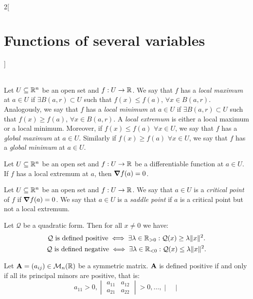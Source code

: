 \documentclass[../../../main_math.tex]{subfiles}
\begin{document}
\begin{multicols}{2}[\section{Functions of several variables}]
\begin{remark}
\begin{align*}
    \end{align*}
  \end{remark}
  \begin{definition}
    Let $U\subseteq\RR^n$ be an open set and $f:U\rightarrow\RR $. We say that $f$ has a \emph{local maximum} at $a\in U$ if $\exists B(a,r)\subset U$ such that $f(x)\leq f(a)$, $\forall x\in B(a,r)$. Analogously, we say that $f$ has a \emph{local minimum} at $a\in U$ if $\exists B(a,r)\subset U$ such that $f(x)\geq f(a)$, $\forall x\in B(a,r)$. A \emph{local extremum} is either a local maximum or a local minimum. Moreover, if $f(x)\leq f(a)$ $\forall x\in U$, we say that $f$ has a \emph{global maximum} at $a\in U$. Similarly if $f(x)\geq f(a)$ $\forall x\in U$, we say that $f$ has a \emph{global minimum} at $a\in U$.
  \end{definition}
  \begin{proposition}
    Let $U\subseteq\RR^n$ be an open set and $f:U\rightarrow\RR $ be a differentiable function at $a\in U$. If $f$ has a local extremum at $a$, then $\grad f(a)=0$.
  \end{proposition}
  \begin{definition}
    Let $U\subseteq\RR^n$ be an open set and $f:U\rightarrow\RR $. We say that $a\in U$ is a \emph{critical point} of $f$ if $\grad f(a)=0$. We say that $a\in U$ is a \emph{saddle point} if $a$ is a critical point but not a local extremum.
  \end{definition}
  \begin{theorem}
    Let $\mathcal{Q}$ be a quadratic form. Then for all $x\ne 0$ we have:
    \begin{gather*}
      \mathcal{Q}\text{ is defined positive}\iff\exists\lambda\in\mathbb{R}_{>0}:\mathcal{Q}(x)\geq\lambda\|x\|^2.\\
      \mathcal{Q}\text{ is defined negative}\iff\exists\lambda\in\mathbb{R}_{<0}:\mathcal{Q}(x)\leq\lambda\|x\|^2.
    \end{gather*}
  \end{theorem}
  \begin{proposition}
    Let $\vf{A}=(a_{ij})\in\mathcal{M}_n(\RR )$ be a symmetric matrix. $\vf{A}$ is defined positive if and only if all its principal minors are positive, that is:
    $$a_{11}>0,
      \begin{vmatrix}
        a_{11} & a_{12} \\
        a_{21} & a_{22}\end{vmatrix}>0,\ldots,
      \begin{vmatrix}

\end{vmatrix}$$
\end{proposition}
\end{multicols}
\end{document}
